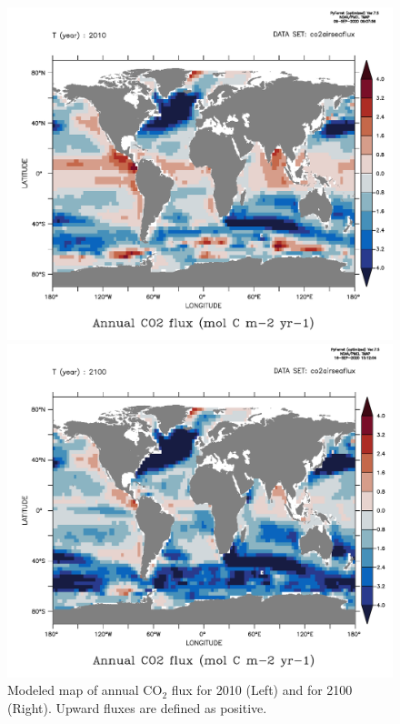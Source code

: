 \documentclass[a4paper]{article}
\begin{document}
\begin{enumerate}
\begin{figure}[H]   %
   \centering
   \begin{minipage}{0.45\columnwidth}
      \centering
      \includegraphics[width=\columnwidth]{airseaflux2010.pdf}
   \end{minipage}
   \begin{minipage}{0.45\columnwidth}
      \centering
      \includegraphics[width=\columnwidth]{airseaflux2100.pdf}
   \end{minipage}
   \caption[]{Modeled map of annual $\mathrm{CO_{2}}$ flux for 2010 (Left) and for 2100 (Right). Upward fluxes are defined as positive.}
   \label{fig:airseamap}
\end{figure}


\end{enumerate}
\end{document}
